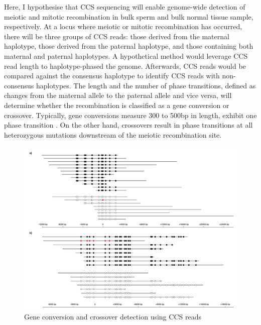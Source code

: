 Here, I hypothesise that CCS sequencing will enable genome-wide detection of meiotic and mitotic recombination in bulk sperm and bulk normal tissue sample, respectively. At a locus where meiotic or mitotic recombination has occurred, there will be three groups of CCS reads: those derived from the maternal haplotype, those derived from the paternal haplotype, and those containing both maternal and paternal haplotypes. A hypothetical method would leverage CCS read length to haplotype-phased the genome. Afterwards, CCS reads would be compared against the consensus haplotype to identify CCS reads with non-consensus haplotypes. The length and the number of phase transitions, defined as changes from the maternal allele to the paternal allele and vice versa, will determine whether the recombination is classified as a gene conversion or crossover.  Typically, gene conversions measure 300 to 500bp in length, exhibit one phase transition \cite{}. On the other hand, crossovers result in phase transitions at all heterozygous mutations downstream of the meiotic recombination site. 

\begin{figure}[h!]
\caption{Gene conversion and crossover detection using CCS reads}
\label{figure:phase-transitions}
\begin{centering}
\includegraphics[width=\textwidth]{meiotic_recombination_detection.pdf} 
\end{centering}
\end{figure}

